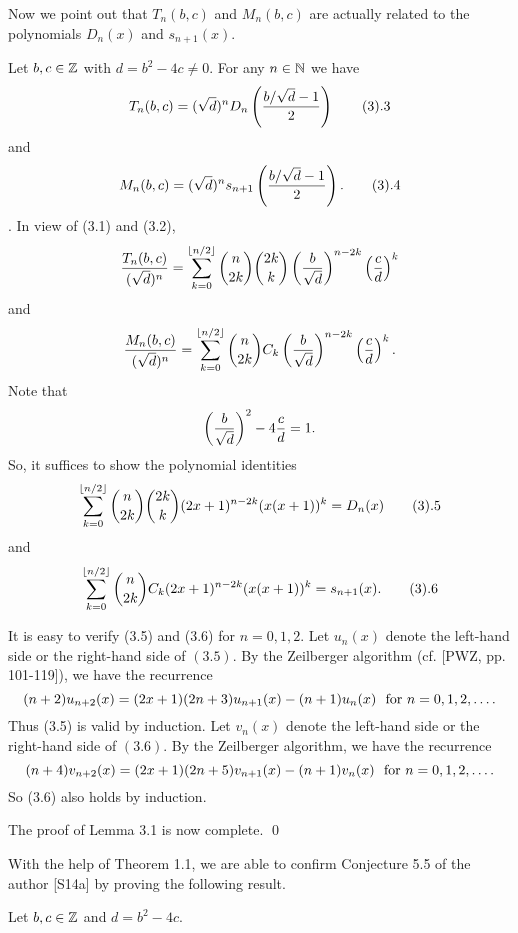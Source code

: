 Now we point out that $T_n(b,c)$ and $M_n(b,c)$ are actually related to the polynomials $D_n(x)$ and $s_{n+1}(x)$.

 Let $b,c\in\Bbb Z$ with $d=b^2-4c\not=0$. For any $n\in\Bbb N$ we have
$$T_n(b,c)=(\sqrt d)^nD_n\l(\f{b/\sqrt d-1}2\r)\tag3.3$$
and
$$M_n(b,c)=(\sqrt d)^ns_{n+1}\l(\f{b/\sqrt d-1}2\r).\tag3.4$$
\endproclaim
\Proof. In view of (3.1) and (3.2),
$$\frac{T_n(b,c)}{(\sqrt d)^n}=\sum_{k=0}^{\lfloor n/2\rfloor}\binom n{2k}\binom{2k}k\left(\frac b{\sqrt d}\right)^{n-2k}\left(\frac cd\right)^k$$
and
$$\frac{M_n(b,c)}{(\sqrt d)^n}=\sum_{k=0}^{\lfloor n/2\rfloor}\binom n{2k}C_k\left(\frac b{\sqrt d}\right)^{n-2k}\left(\frac cd\right)^k.$$
Note that
$$\left(\frac{b}{\sqrt d}\right)^2-4\frac cd=1. $$
So, it suffices to show the polynomial identities
$$\sum_{k=0}^{\lfloor n/2\rfloor}\bi n{2k}\bi{2k}k(2x+1)^{n-2k}(x(x+1))^k= D_n(x)\tag3.5$$
and
$$\sum_{k=0}^{\lfloor n/2\rfloor}\bi n{2k}C_k(2x+1)^{n-2k}(x(x+1))^k= s_{n+1}(x).\tag3.6$$

It is easy to verify (3.5) and (3.6) for $n=0,1,2$.
Let $u_n(x)$ denote the left-hand side or the right-hand side of $(3.5)$. By the Zeilberger algorithm (cf. [PWZ, pp.\,101-119]), we have the recurrence
$$(n+2)u_{n+2}(x)=(2x+1)(2n+3)u_{n+1}(x)-(n+1)u_n(x)\ \ \t{for}\ n=0,1,2,\ldots.$$
Thus (3.5) is valid by induction.
Let $v_n(x)$ denote the left-hand side or the right-hand side of $(3.6)$. By the Zeilberger algorithm, we have the recurrence
$$(n+4)v_{n+2}(x)=(2x+1)(2n+5)v_{n+1}(x)-(n+1)v_n(x)\ \ \t{for}\ n=0,1,2,\ldots.$$
So (3.6) also holds by induction.

The proof of Lemma 3.1 is now complete. \qed


With the help of Theorem 1.1, we are able to confirm Conjecture 5.5 of the author [S14a] by proving the following result.

 Let $b,c\in\Bbb Z$ and $d=b^2-4c$.

